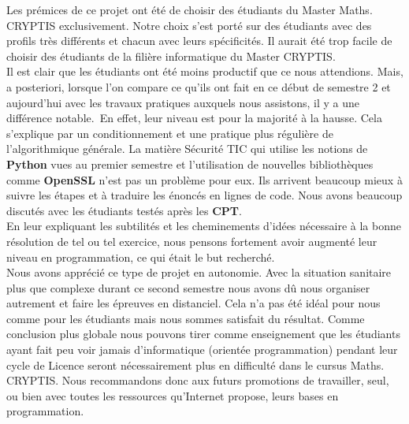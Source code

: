 \documentclass[12pt]{article}
\begin{document}
Les prémices de ce projet ont été de choisir des étudiants du \textsf{Master Maths. CRYPTIS} exclusivement. Notre choix s'est porté sur des étudiants avec des profils très différents et chacun avec leurs spécificités. Il aurait été trop facile de choisir des étudiants de la filière informatique du \textsf{Master CRYPTIS}.\\
Il est clair que les étudiants ont été moins productif que ce nous attendions. Mais, a posteriori, lorsque l'on compare ce qu'ils ont fait en ce début de semestre 2 et aujourd'hui avec les travaux pratiques auxquels nous assistons, il y a une différence notable.\
En effet, leur niveau est pour la majorité à la hausse. Cela s'explique par un conditionnement et une pratique plus régulière de l'algorithmique générale. La matière \textsf{Sécurité TIC} qui utilise les notions de \textbf{Python} vues au premier semestre et l'utilisation de nouvelles bibliothèques comme \textbf{OpenSSL} n'est pas un problème pour eux. Ils arrivent beaucoup mieux à suivre les étapes et à traduire les énoncés en lignes de code. Nous avons beaucoup discutés avec les étudiants testés après les \textbf{CPT}.\\
En leur expliquant les subtilités et les cheminements d'idées nécessaire à la bonne résolution de tel ou tel exercice, nous pensons fortement avoir augmenté leur niveau en programmation, ce qui était le but recherché.\\
Nous avons apprécié ce type de projet en autonomie. Avec la situation sanitaire plus que complexe durant ce second semestre nous avons dû nous organiser autrement et faire les épreuves en distanciel. Cela n'a pas été idéal pour nous comme pour les étudiants mais nous sommes satisfait du résultat. Comme conclusion plus globale nous pouvons tirer comme enseignement que les étudiants ayant fait peu voir jamais d'informatique (orientée programmation) pendant leur cycle de Licence seront nécessairement plus en difficulté dans le cursus \textsf{Maths. CRYPTIS}. Nous recommandons donc aux futurs promotions de travailler, seul, ou bien avec toutes les ressources qu'Internet propose, leurs bases en programmation.

\pagebreak
\end{document}
